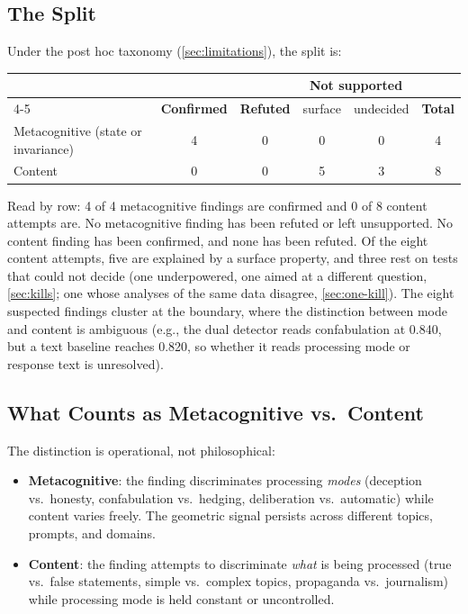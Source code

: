 \documentclass[11pt,a4paper]{article}
\begin{document}
\subsection{The Split}

Under the post hoc taxonomy (\cref{sec:limitations}), the split is:

\begin{center}
\small
\begin{tabular}{lccccc}
\toprule
& & & \multicolumn{2}{c}{\textbf{Not supported}} & \\
\cmidrule(lr){4-5}
& \textbf{Confirmed} & \textbf{Refuted} & surface & undecided & \textbf{Total} \\
\midrule
Metacognitive (state or invariance) & 4 & 0 & 0 & 0 & 4 \\
Content & 0 & 0 & 5 & 3 & 8 \\
\bottomrule
\end{tabular}
\end{center}

\noindent Read by row: 4 of 4 metacognitive findings are confirmed and
0 of 8 content attempts are. No metacognitive finding has been refuted
or left unsupported. No content finding has been confirmed, and none
has been refuted. Of the eight content attempts, five are explained by
a surface property, and three rest on tests that could not decide (one
underpowered, one aimed at a different question, \cref{sec:kills}; one
whose analyses of the same data disagree, \cref{sec:one-kill}). The eight suspected findings cluster at the
boundary, where the distinction between mode and content is ambiguous
(e.g., the dual detector reads confabulation at 0.840, but a text
baseline reaches 0.820, so whether it reads processing mode or response
text is unresolved).

\subsection{What Counts as Metacognitive vs.\ Content}

The distinction is operational, not philosophical:

\begin{itemize}[nosep]
\item \textbf{Metacognitive}: the finding discriminates processing
  \emph{modes} (deception vs.\ honesty, confabulation vs.\ hedging,
  deliberation vs.\ automatic) while content varies freely. The
  geometric signal persists across different topics, prompts, and
  domains.
\item \textbf{Content}: the finding attempts to discriminate
  \emph{what} is being processed (true vs.\ false statements,
  simple vs.\ complex topics, propaganda vs.\ journalism) while
  processing mode is held constant or uncontrolled.
\end{itemize}
\end{document}

